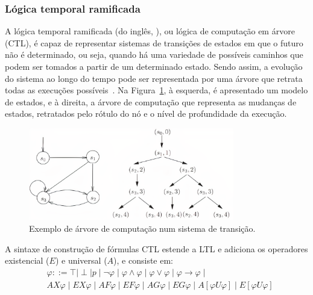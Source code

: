\subsubsection*{\textbf{Lógica temporal ramificada}}

A lógica temporal ramificada (do inglês, ), ou lógica de computação em árvore (CTL), é capaz de representar sistemas de transições de estados em que o futuro não é determinado, ou seja, quando há uma variedade de possíveis caminhos que podem ser tomados a partir de um determinado estado. Sendo assim, a evolução do sistema ao longo do tempo pode ser representada por uma árvore que retrata todas as execuções possíveis~\cite{huth2004logic}. Na Figura~\ref{fig:ctl_ex}, à esquerda, é apresentado um modelo de estados, e à direita, a árvore de computação que representa as mudanças de estados, retratados pelo rótulo do nó e o nível de profundidade da execução.

\begin{figure}[ht]
    \caption{Exemplo de árvore de computação num sistema de transição.} \label{fig:ctl_ex}
	\centering
	\includegraphics[width=0.8\textwidth]{figuras/ctl_ex.png}
\end{figure}

A sintaxe de construção de fórmulas CTL estende a LTL e adiciona os operadores existencial ($E$) e universal ($A$), e consiste em:
\begin{align}
& \varphi ::= \top \mid \perp \mid p \mid \neg \varphi \mid \varphi \wedge \varphi \mid \varphi\vee\varphi \mid \varphi \to \varphi \mid \nonumber \\ 
& AX\varphi \mid EX\varphi \mid AF\varphi \mid EF\varphi \mid AG\varphi \mid EG\varphi \mid A[\varphi U \varphi]\mid E[\varphi U \varphi] \label{eq:ctl}
\end{align}

